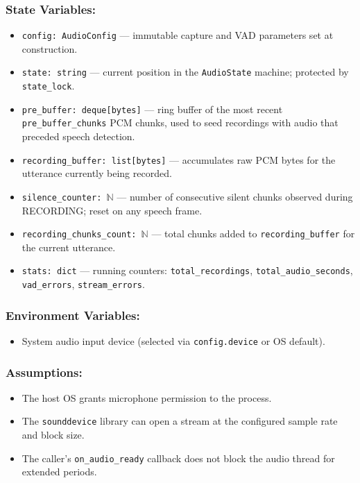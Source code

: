 \documentclass[12pt, titlepage]{article}
\begin{document}
\subsubsection{State Variables:}
\begin{itemize}
  \item \texttt{config: AudioConfig} — immutable capture and VAD parameters set at construction.
  \item \texttt{state: string} — current position in the \texttt{AudioState} machine; protected by \texttt{state\_lock}.
  \item \texttt{pre\_buffer: deque[bytes]} — ring buffer of the most recent \texttt{pre\_buffer\_chunks} PCM chunks, used to seed recordings with audio that preceded speech detection.
  \item \texttt{recording\_buffer: list[bytes]} — accumulates raw PCM bytes for the utterance currently being recorded.
  \item \texttt{silence\_counter: $\mathbb{N}$} — number of consecutive silent chunks observed during RECORDING; reset on any speech frame.
  \item \texttt{recording\_chunks\_count: $\mathbb{N}$} — total chunks added to \texttt{recording\_buffer} for the current utterance.
  \item \texttt{stats: dict} — running counters: \texttt{total\_recordings}, \texttt{total\_audio\_seconds}, \texttt{vad\_errors}, \texttt{stream\_errors}.
\end{itemize}

\subsubsection{Environment Variables:}
\begin{itemize}
  \item System audio input device (selected via \texttt{config.device} or OS default).
\end{itemize}

\subsubsection{Assumptions:}
\begin{itemize}
  \item The host OS grants microphone permission to the process.
  \item The \texttt{sounddevice} library can open a stream at the configured sample rate and block size.
  \item The caller's \texttt{on\_audio\_ready} callback does not block the audio thread for extended periods.
\end{itemize}
\end{document}
